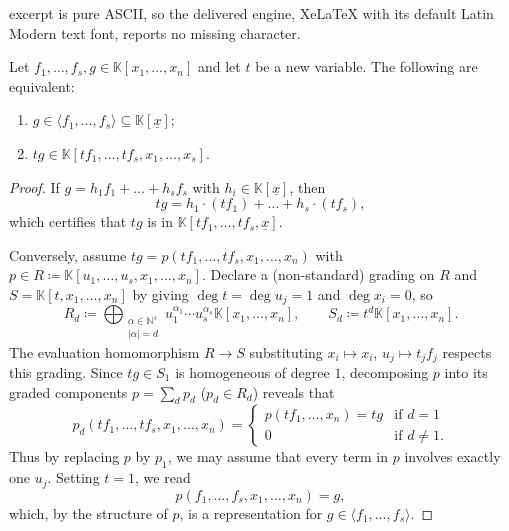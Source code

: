 \documentclass[10pt,a4paper]{amsart}
\newcommand{\KK}{\mathbb{K}}
\newcommand{\NN}{\mathbb{N}}
\newcommand{\x}{{\underline x}}
\begin{document}
excerpt is pure ASCII, so the delivered engine, XeLaTeX with its default Latin Modern text font, reports no missing character.
\begin{theorem}\label{thm:ideal_to_algebra}
Let $f_1,\dots,f_s,g \in \KK[x_1,\dots,x_n]$ and let $t$ be a new variable. The following are equivalent:
\begin{enumerate}[label=\textup{(\alph*)}]
\item $g \in \langle f_1,\dots,f_s\rangle \subseteq \KK[\x]$;
\item $tg \in \KK[tf_1,\dots,tf_s,x_1,\dots,x_s]$.
\end{enumerate}
\end{theorem}

\begin{proof}
If $g = h_1f_1+\dots+h_sf_s$ with $h_i \in \KK[\x]$, then
\[
tg = h_1\cdot (tf_1)+\dots+h_s\cdot (tf_s),
\]
which certifies that $tg$ is in $\KK[tf_1,\dots,tf_s,\x]$.

Conversely, assume $tg = p(tf_1,\dots,tf_s,x_1,\dots,x_n)$ with $p \in R \coloneqq \KK[u_1,\dots,u_s,x_1,\dots,x_n]$. Declare a (non-standard) grading on $R$ and $S=\KK[t,x_1,\dots,x_n]$ by giving $\deg t = \deg u_j = 1$ and $\deg x_i = 0$, so
\[
R_d \coloneqq \bigoplus_{\substack{\alpha \in \NN^s\\ |\alpha|=d}} u_1^{\alpha_1}\dotsm u_s^{\alpha_s}\KK[x_1,\dots,x_n], \qquad S_d \coloneqq t^d\KK[x_1,\dots,x_n].
\]
The evaluation homomorphism $R\to S$ substituting $x_i \mapsto x_i$, $u_j \mapsto t_jf_j$ respects this grading. Since $tg \in S_1$ is homogeneous of degree $1$, decomposing $p$ into its graded components $p=\sum_d p_d$ ($p_d \in R_d$) reveals that
\[
p_d(tf_1,\dots,tf_s,x_1,\dots,x_n) = \begin{cases}
p(tf_1,\dots,x_n) = tg & \text{if }d=1 \\
0 & \text{if }d\neq 1.
\end{cases}
\]
Thus by replacing $p$ by $p_1$, we may assume that every term in $p$ involves exactly one $u_j$. Setting $t=1$, we read
\[
p(f_1,\dots,f_s,x_1,\dots,x_n) = g,
\]
which, by the structure of $p$, is a representation for $g \in \langle f_1,\dots,f_s\rangle$.
\end{proof}
\end{document}
